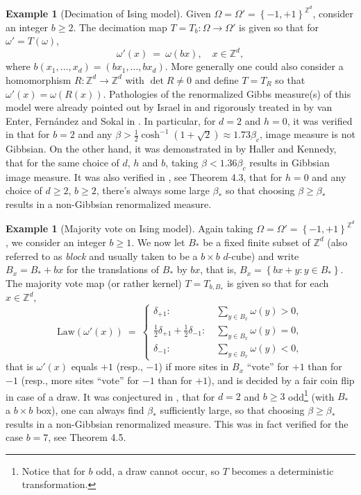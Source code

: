 \documentclass[12pt]{article}
\newcommand{\Z}{\mathbb{Z}}
\newcommand{\set}[1]{\left\{#1\right\}}
\newcommand{\ra}{\rightarrow}
\newcommand{\1}{\mathbbm{1}}
\newcommand{\5}{\vspace{0.5cm}}
\theoremstyle{definition}
\newtheorem{ex}[thm]{Example}
\begin{document}
\begin{ex}[Decimation of Ising model]
Given $\Omega=\Omega'=\set{-1,+1}^{\Z^d}$, consider an integer $b\geq 2$. The decimation map $T=T_b:\Omega\ra\Omega'$ is given so that for $\omega'=T(\omega)$,
$$\omega'(x) ~=~ \omega(bx), \quad x\in\Z^d,$$
where $b(x_1,\ldots,x_d)=(bx_1,\ldots,bx_d)$. More generally one could also consider a homomorphism $R:\Z^d\ra\Z^d$ with $\det R\neq 0$ and define $T=T_R$ so that $\omega'(x)=\omega(R(x))$. Pathologies of the renormalized Gibbs measure(s) of  this model were already pointed out by Israel in \cite{Isr} and rigorously treated in by van Enter, Fern\'andez and Sokal in \cite{EFS}. In particular, for $d=2$ and $h=0$, it was verified in \cite{EFS} that for $b=2$ and any $\beta>\frac{1}{2}\cosh^{-1}(1+\sqrt{2})\approx 1.73\beta_c$, image measure is not Gibbsian. On the other hand, it was demonstrated in \cite{HK} by Haller and Kennedy, that for the same choice of $d$, $h$ and $b$, taking $\beta<1.36\beta_c$ results in Gibbsian image measure. It was also verified in \cite{EFS}, see Theorem 4.3, that for $h=0$ and any choice of $d\geq 2$, $b\geq 2$, there's always some large $\beta_*$ so that choosing $\beta\geq \beta_*$ results in a non-Gibbsian renormalized measure.
\end{ex}

\begin{ex}[Majority vote on Ising model]
Again taking $\Omega=\Omega'=\set{-1,+1}^{\Z^d}$, we consider an integer $b\geq 1$. We now let $B_*$ be a fixed finite subset of $\Z^d$ (also referred to as \textit{block} and usually taken to be a $b\times b$ $d$-cube) and write $B_x=B_*+bx$ for the translations of $B_*$ by $bx$, that is, $B_x=\set{bx+y:y\in B_*}$. The majority vote map (or rather kernel) $T=T_{b,B_*}$ is given so that for each $x\in\Z^d$,
$$\mathrm{Law}(\omega'(x)) ~=~ \begin{cases}
\delta_{+1}: ~&\sum_{y\in B_x}\omega(y)>0, \\
\frac{1}{2}\delta_{+1}+\frac{1}{2}\delta_{-1}: ~&\sum_{y\in B_x}\omega(y)=0, \\
\delta_{-1}: ~&\sum_{y\in B_x}\omega(y)<0,
\end{cases}$$
that is $\omega'(x)$ equals $+1$ (resp., $-1$) if more sites in $B_x$ ``vote'' for $+1$ than for $-1$ (resp., more sites ``vote'' for $-1$ than for $+1$), and is decided by a fair coin flip in case of a draw. It was conjectured in \cite{EFS}, that for $d=2$ and $b\geq 3$ odd\footnote{Notice that for $b$ odd, a draw cannot occur, so $T$ becomes a deterministic transformation.} (with $B_*$ a $b\times b$ box), one can always find $\beta_*$ sufficiently large, so that choosing $\beta\geq\beta_*$ results in a non-Gibbsian renormalized measure. This was in fact verified for the case $b=7$, see Theorem 4.5. 
\end{ex}
\end{document}

